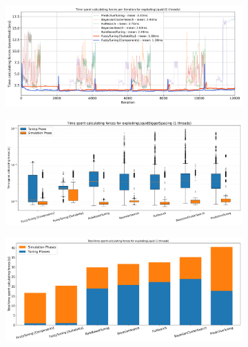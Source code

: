 \begin{figure}[H]
    \centering

    \begin{subfigure}[c]{\textwidth}
        \includegraphics[width=\columnwidth,trim={0cm 0 0cm 0.9cm},clip]{figures/Benchmark/ExplodingLiquid/timing_explodingLiquid_1.png}
        \caption{}
        \label{fig:explodingTimings_1thread}
    \end{subfigure}


    \begin{subfigure}[c]{\textwidth}
        \includegraphics[width=\columnwidth,trim={0cm 0 0cm 1cm},clip]{figures/Benchmark/ExplodingLiquid/boxplot_explodingLiquid_1.png}
        \caption{}
        \label{fig:explodingLiquidBoxplot_1thread}
    \end{subfigure}

    \begin{subfigure}[b]{\textwidth}
        \includegraphics[width=\columnwidth,trim={0cm 0 0cm 0.9cm},clip]{figures/Benchmark/ExplodingLiquid/total_time_explodingLiquid_1.png}
        \caption{}
        \label{fig:explodingLiquidTotalTime_1thread}
    \end{subfigure}



\end{figure}
